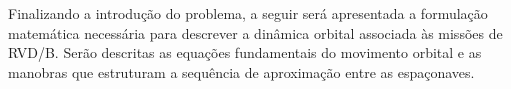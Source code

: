 

Finalizando a introdução do problema, a seguir será apresentada a formulação matemática necessária para descrever a dinâmica orbital associada às missões de RVD/B.
Serão descritas as equações fundamentais do movimento orbital e as manobras que estruturam a sequência de aproximação entre as espaçonaves.
